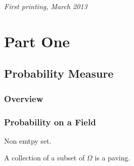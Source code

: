 \documentclass[11pt,fleqn]{book} %
\begin{document}
\noindent \textit{First printing, March 2013} %



\pagestyle{empty} %

\tableofcontents %

\cleardoublepage %

\pagestyle{fancy} %


\part{Part One}



\chapter{Probability Measure}

\section{Overview}

\section{Probability on a Field}

\begin{definition}[$\Omega$] Non emtpy set. 
	
\end{definition}

\begin{definition}[Paving] A collection of a subset of $\Omega$ is a paving. 
	
\end{definition}
\end{document}
